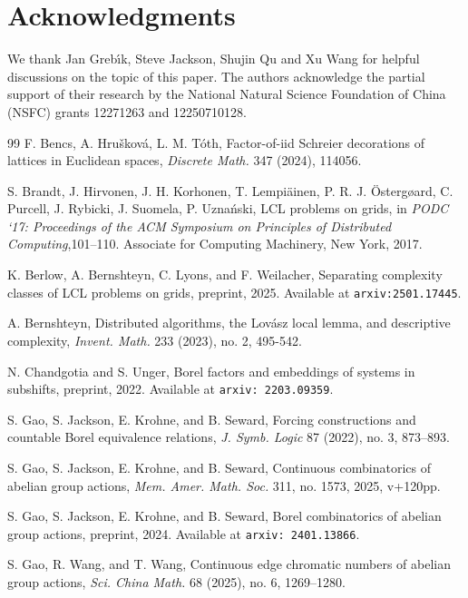 \documentclass[11pt]{amsart}
\theoremstyle{definition}
\begin{document}
\section*{Acknowledgments}

We thank Jan Greb\'{\i}k, Steve Jackson, Shujin Qu and Xu Wang for helpful discussions on the topic of this paper. The authors acknowledge the partial support of their research by the National Natural Science Foundation of China (NSFC) grants 12271263 and 12250710128.

\begin{thebibliography}{99}
F. Bencs, A. Hru\v{s}kov\'a, L. M. T\'oth, Factor-of-iid Schreier decorations of lattices in Euclidean spaces, \textit{Discrete Math.} 347 (2024), 114056.

S. Brandt, J. Hirvonen, J. H. Korhonen, T. Lempi\"ainen, P. R. J. \"{O}sterg\o{a}rd, C. Purcell, J. Rybicki, J. Suomela, P. Uzna\'{n}ski,
LCL problems on grids, in \textit{PODC `17: Proceedings of the ACM Symposium on Principles of Distributed Computing},101--110.  Associate for Computing Machinery, New York, 2017.

K. Berlow, A. Bernshteyn, C. Lyons, and F. Weilacher, 
Separating complexity classes of LCL problems on grids, preprint, 2025. Available at {\tt arxiv:2501.17445}.


A. Bernshteyn,
Distributed algorithms, the Lov\'{a}sz local lemma, and descriptive complexity, \textit{Invent. Math.} 233 (2023), no. 2, 495-542.

N. Chandgotia and S. Unger, Borel factors and embeddings of systems in subshifts, preprint, 2022. Available at {\tt arxiv:\,2203.09359}.

S. Gao, S. Jackson, E. Krohne, and B. Seward, Forcing constructions and countable Borel equivalence relations, \emph{J. Symb. Logic} 87 (2022), no. 3, 873--893.

S. Gao, S. Jackson, E. Krohne, and B. Seward, Continuous combinatorics of abelian group actions, \textit{Mem. Amer. Math. Soc.} 311, no. 1573, 2025, v+120pp.

S. Gao, S. Jackson, E. Krohne, and B. Seward, Borel combinatorics of abelian group actions, preprint, 2024. Available at {\tt arxiv:\,2401.13866}.

S. Gao, R. Wang, and T. Wang, Continuous edge chromatic numbers of abelian group actions, \textit{Sci. China Math.} 68 (2025), no. 6, 1269--1280.


\end{thebibliography}
\end{document}
